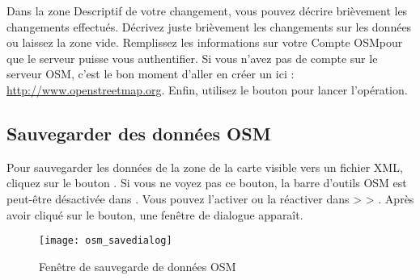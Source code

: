 Dans la zone \og Descriptif de votre changement\fg, vous pouvez décrire brièvement les changements effectués. Décrivez juste brièvement les changements sur les données ou laissez la zone vide.
Remplissez les informations sur votre \og Compte OSM\fg pour que le serveur puisse vous authentifier. Si vous n'avez pas de compte sur le serveur OSM, c'est le bon moment d'aller en créer un ici : \url{http://www.openstreetmap.org}. Enfin, utilisez le bouton  pour lancer l'opération.


\subsection{Sauvegarder des données OSM}  

Pour sauvegarder les données de la zone de la carte visible vers un fichier XML, cliquez sur le bouton . Si vous ne voyez pas ce bouton, la barre d'outils OSM est peut-être désactivée dans \qg. Vous pouvez l'activer ou la réactiver dans  >  > . Après avoir cliqué sur le bouton, une fenêtre de dialogue apparaît.

\begin{figure}[ht]
\centering
   \texttt{[image: osm\_savedialog]}
   \caption{Fenêtre de sauvegarde de données OSM \nixcaption}\label{fig:osmsave}
\end{figure}

